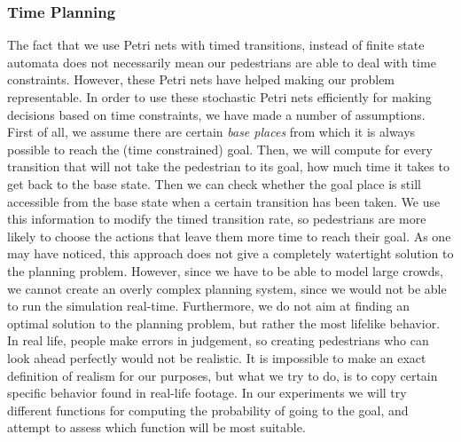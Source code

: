 \documentclass[11pt]{book}
\begin{document}

\subsubsection{Time Planning}
The fact that we use Petri nets with timed transitions, instead of finite state automata does not necessarily mean our pedestrians are able to deal with time constraints. However, these Petri nets have helped making our problem representable. In order to use these stochastic Petri nets efficiently for making decisions based on time constraints, we have made a number of assumptions.\\
First of all, we assume there are certain \emph{base places} from which it is always possible to reach the (time constrained) goal. Then, we will compute for every transition that will not take the pedestrian to its goal, how much time it takes to get back to the base state. Then we can check whether the goal place is still accessible from the base state when a certain transition has been taken. We use this information to modify the timed transition rate, so pedestrians are more likely to choose the actions that leave them more time to reach their goal.
As one may have noticed, this approach does not give a completely watertight solution to the planning problem. However, since we have to be able to model large crowds, we cannot create an overly complex planning system, since we would not be able to run the simulation real-time. Furthermore, we do not aim at finding an optimal solution to the planning problem, but rather the most lifelike behavior. In real life, people make errors in judgement, so creating pedestrians who can look ahead perfectly would not be realistic. It is impossible to make an exact definition of realism for our purposes, but what we try to do, is to copy certain specific behavior found in real-life footage. In our experiments we will try different functions for computing the probability of going to the goal, and attempt to assess which function will be most suitable.
\end{document}
